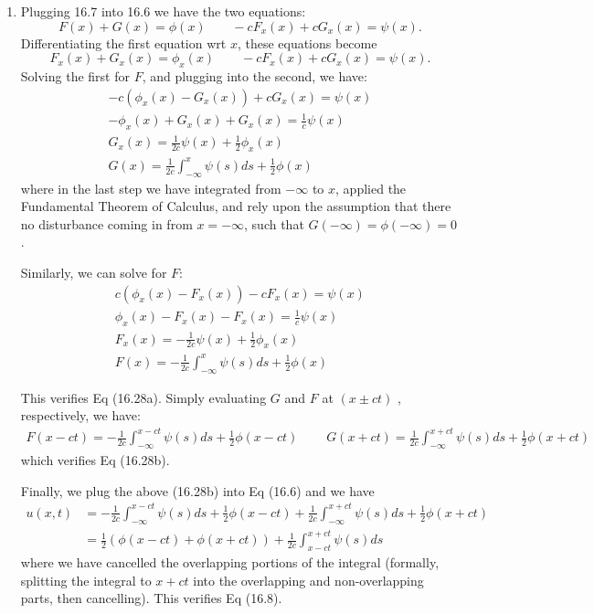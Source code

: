 \documentclass[11pt]{article}
\def\f{\frac }
\begin{document}
\begin{enumerate}
\clearpage
\pagebreak
\item Plugging 16.7 into 16.6 we have the two equations:
\[ F(x) + G(x) = \phi (x) ~~~~~~~~~ -cF_x(x) + cG_x(x) = \psi (x) .\]
Differentiating the first equation wrt $x$, these equations become
\[ F_x(x) + G_x(x) = \phi _x(x) ~~~~~~~~~ -cF_x(x) + cG_x(x) = \psi (x) .\]
Solving the first for $F$, and plugging into the second, we have:
\begin{align*} -c\left ( \phi _x(x) - G_x(x) \right )  + cG_x(x) = \psi (x) \\
-\phi _x(x) + G_x(x)  + G_x(x) = \f{1}{c}\psi (x) \\
G_x(x) = \f{1}{2c}\psi (x) + \f{1}{2} \phi _x (x)\\
G(x) = \f{1}{2c}\int _{-\infty} ^{x} \psi (s) ds + \f{1}{2} \phi (x)\end{align*}
where in the last step we have integrated from $-\infty$ to $x$, applied the Fundamental Theorem of Calculus, and rely upon the assumption that there no disturbance coming in from $x= -\infty$, such that $G(-\infty) = \phi(-\infty) = 0$.

Similarly, we can solve for $F$:
\begin{align*} c\left ( \phi _x(x) - F_x(x) \right )  - cF_x(x) = \psi (x) \\
\phi _x(x) - F_x(x)  - F_x(x) = \f{1}{c}\psi (x) \\
F_x(x) = -\f{1}{2c}\psi (x) + \f{1}{2} \phi _x (x)\\
F(x) = -\f{1}{2c}\int _{-\infty} ^{x} \psi (s) ds + \f{1}{2} \phi (x)\end{align*}


This verifies Eq (16.28a).
Simply evaluating $G$ and $F$ at $(x\pm ct)$ , respectively, we have:
\begin{align*} F(x-ct) = -\f{1}{2c}\int _{-\infty} ^{x-ct} \psi (s) ds + \f{1}{2} \phi (x-ct)~~~~~~~~~~G(x+ct) = \f{1}{2c}\int _{-\infty} ^{x+ct} \psi (s) ds + \f{1}{2} \phi (x+ct)\end{align*}
which verifies Eq (16.28b).

Finally, we plug the above (16.28b) into Eq (16.6) and we have
\begin{align*} u(x,t) &= -\f{1}{2c}\int _{-\infty} ^{x-ct} \psi (s) ds + \f{1}{2} \phi (x-ct) +  \f{1}{2c}\int _{-\infty} ^{x+ct} \psi (s) ds + \f{1}{2} \phi (x+ct)\\
&= \f{1}{2} \left ( \phi (x-ct)  + \phi (x+ct) \right ) +  \f{1}{2c}\int _{x-ct} ^{x+ct} \psi (s) ds\end{align*}
where we have cancelled the overlapping portions of the integral (formally, splitting the integral to $x+ct$ into the overlapping and non-overlapping parts, then cancelling).
This verifies Eq (16.8).
\end{enumerate}
\end{document}
